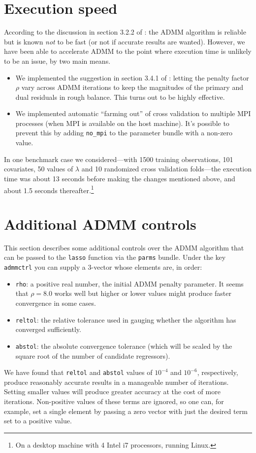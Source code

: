 \documentclass{article}
\begin{document}
\section{Execution speed}
\label{sec:speed}

According to the discussion in section 3.2.2 of \cite{boyd2010}: the
ADMM algorithm is reliable but is known \textit{not} to be fast (or
not if accurate results are wanted). However, we have been able to
accelerate ADMM to the point where execution time is unlikely to be an
issue, by two main means.
\begin{itemize}
\item We implemented the suggestion in section 3.4.1 of
  \cite{boyd2010}: letting the penalty factor $\rho$ vary across ADMM
  iterations to keep the magnitudes of the primary and dual residuals
  in rough balance. This turns out to be highly effective.
\item We implemented automatic ``farming out'' of cross validation to
  multiple \textsf{MPI} processes (when \textsf{MPI} is available on
  the host machine). It's possible to prevent this by adding
  \texttt{no\_mpi} to the parameter bundle with a non-zero value.
\end{itemize}
In one benchmark case we considered---with 1500 training observations,
101 covariates, 50 values of $\lambda$ and 10 randomized cross
validation folds---the execution time was about 13 seconds before
making the changes mentioned above, and about 1.5 seconds
thereafter.\footnote{On a desktop machine with 4 Intel i7 processors,
  running Linux.}

\section{Additional ADMM controls}
\label{sec:add-controls}

This section describes some additional controls over the ADMM
algorithm that can be passed to the \texttt{lasso} function via the
\texttt{parms} bundle. Under the key \texttt{admmctrl} you can supply
a 3-vector whose elements are, in order:
\begin{itemize}
\item \texttt{rho}: a positive real number, the initial ADMM penalty
  parameter. It seems that $\rho = 8.0$ works well but higher or lower
  values might produce faster convergence in some cases.
\item \texttt{reltol}: the relative tolerance used in gauging whether
  the algorithm has converged sufficiently.
\item \texttt{abstol}: the absolute convergence tolerance (which will
  be scaled by the square root of the number of candidate regressors).
\end{itemize}
We have found that \texttt{reltol} and \texttt{abstol} values of
$10^{-4}$ and $10^{-6}$, respectively, produce reasonably accurate
results in a manageable number of iterations. Setting smaller values
will produce greater accuracy at the cost of more iterations.
Non-positive values of these terms are ignored, so one can, for
example, set a single element by passing a zero vector with just the
desired term set to a positive value.
\end{document}
